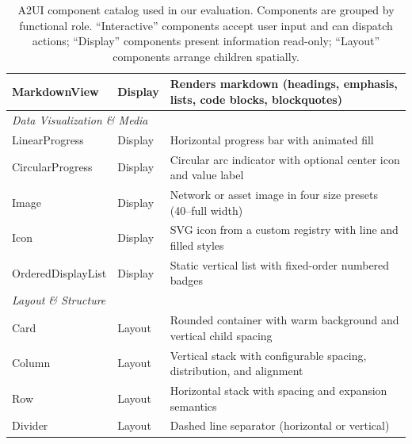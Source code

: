 \begin{table}[h]
\begin{tabular}{llp{7.2cm}}
MarkdownView & Display & Renders markdown (headings, emphasis, lists, code blocks, blockquotes) \\
\midrule
\multicolumn{3}{l}{\textit{Data Visualization \& Media}} \\
LinearProgress & Display & Horizontal progress bar with animated fill \\
CircularProgress & Display & Circular arc indicator with optional center icon and value label \\
Image & Display & Network or asset image in four size presets (40--full width) \\
Icon & Display & SVG icon from a custom registry with line and filled styles \\
OrderedDisplayList & Display & Static vertical list with fixed-order numbered badges \\
\midrule
\multicolumn{3}{l}{\textit{Layout \& Structure}} \\
Card & Layout & Rounded container with warm background and vertical child spacing \\
Column & Layout & Vertical stack with configurable spacing, distribution, and alignment \\
Row & Layout & Horizontal stack with spacing and expansion semantics \\
Divider & Layout & Dashed line separator (horizontal or vertical) \\
\bottomrule
\end{tabular}

\caption{A2UI component catalog used in our evaluation. Components are grouped by functional role. ``Interactive'' components accept user input and can dispatch actions; ``Display'' components present information read-only; ``Layout'' components arrange children spatially.}
\label{tab:component-catalog}
\end{table}

